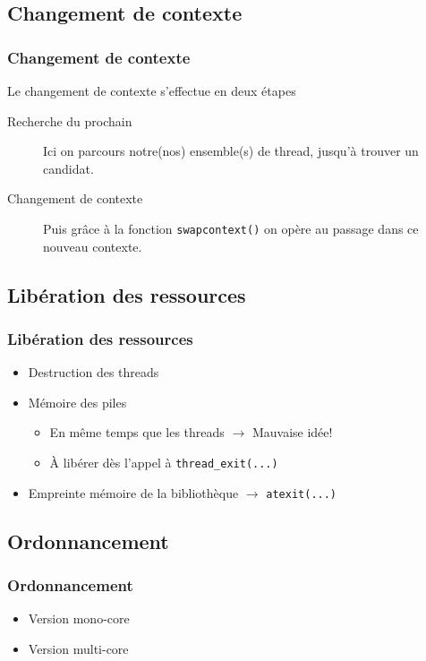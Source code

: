 \documentclass{beamer}
\begin{document}
\subsection{Changement de contexte}

\begin{frame}
  \frametitle{Changement de contexte}
  Le changement de contexte s'effectue en deux étapes
  
  \begin{description}
  \item[Recherche du prochain] Ici on parcours notre(nos) ensemble(s) de thread, jusqu'à trouver un candidat.
  \item[Changement de contexte] Puis grâce à la fonction \verb!swapcontext()! on opère au passage dans ce nouveau contexte.
	
\end{description}

\end{frame}

\subsection{Libération des ressources}

\begin{frame}[containsverbatim]
  \frametitle{Libération des ressources}
  \begin{itemize}
  \item Destruction des threads
  \item Mémoire des piles
    \begin{itemize}
    \item En même temps que les threads $\rightarrow $ Mauvaise idée!
    \item À libérer dès l'appel à \verb!thread_exit(...)!
    \end{itemize}
  \item Empreinte mémoire de la bibliothèque
    $\rightarrow $ \verb!atexit(...)!
  \end{itemize}
\end{frame}

\subsection{Ordonnancement}

\begin{frame}
  \frametitle{Ordonnancement}
  \begin{itemize}
    \item Version mono-core
    \item Version multi-core
  \end{itemize}
\end{frame}
\end{document}
